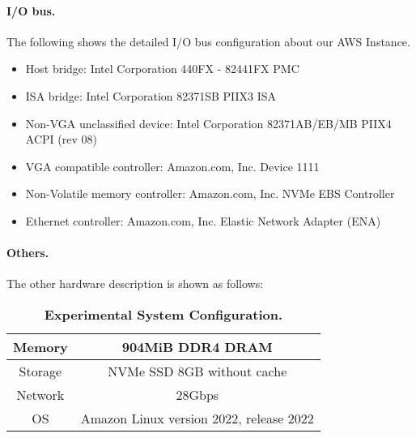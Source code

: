 \paragraph{I/O bus.} The following shows the detailed I/O bus configuration about our AWS Instance.
\begin{itemize}[leftmargin=*]
	\item Host bridge: Intel Corporation 440FX - 82441FX PMC
	\item ISA bridge: Intel Corporation 82371SB PIIX3 ISA 
	\item Non-VGA unclassified device: Intel Corporation 82371AB/EB/MB PIIX4 ACPI (rev 08)
	\item VGA compatible controller: Amazon.com, Inc. Device 1111
	\item Non-Volatile memory controller: Amazon.com, Inc. NVMe EBS Controller
	\item Ethernet controller: Amazon.com, Inc. Elastic Network Adapter (ENA)
\end{itemize}

\paragraph{Others.} The other hardware description is shown as follows:
\begin{table}[h]
	\centering
	\begin{tabular}{c|c}
		\hline
		Memory & 904MiB DDR4 DRAM \\ \hline
		
		Storage & NVMe SSD 8GB without cache \\ \hline

		Network & 28Gbps \\ \hline
		
		OS & Amazon Linux version 2022, release 2022 \\ \hline
	\end{tabular}
	\caption{\textbf{Experimental System Configuration.}}
	\label{table:sys-conf}
\end{table}


